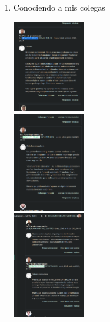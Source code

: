 \documentclass[11pt]{article}
\begin{document}
\begin{enumerate}[{\bf Sesi\'on} 1{.}]
\begin{enumerate}[{\bf Actividad} 1{.}]
				\item {Conociendo a mis colegas}
					\begin{multicols}{3}			
						\includegraphics[width=0.25\textwidth] {CIVUL-U1-S1-A2-1}\\
						\includegraphics[width=0.25\textwidth] {CIVUL-U1-S1-A2-2-1}\\
						\includegraphics[width=0.25\textwidth] {CIVUL-U1-S1-A2-2-2}\\
					\end{multicols}
					

\end{enumerate}
\end{enumerate}
\end{document}
